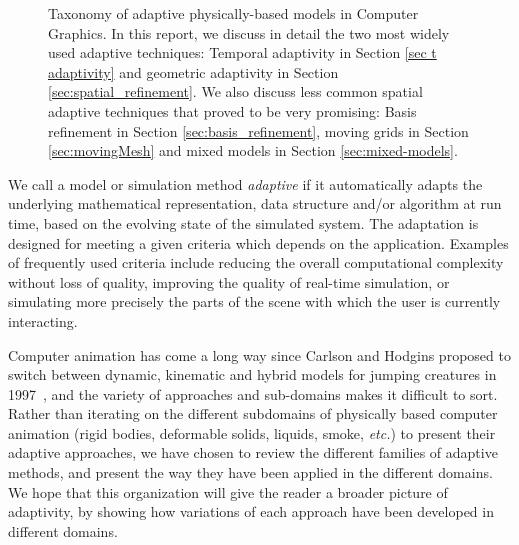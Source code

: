 \begin{figure}
    \caption{\label{fig:taxonomy}Taxonomy of adaptive physically-based models in Computer Graphics. In this report, we discuss in detail the two most widely used adaptive techniques: Temporal adaptivity in Section \ref{sec t adaptivity} and geometric adaptivity in Section \ref{sec:spatial_refinement}. We also discuss less common spatial adaptive techniques that proved to be very promising: Basis refinement in Section \ref{sec:basis_refinement}, moving grids in Section \ref{sec:movingMesh} and mixed models in Section \ref{sec:mixed-models}.}
\end{figure}

We call a model or simulation method \emph{adaptive} if it automatically adapts the underlying mathematical representation, data structure and/or algorithm at run time, based on the evolving state of the simulated system.
The adaptation is designed for meeting a given criteria which depends on the application. Examples of frequently used criteria include reducing the overall computational complexity without loss of quality, improving the quality of real-time simulation, or simulating more precisely the parts of the scene with which the user is currently interacting.

Computer animation has come a long way since Carlson and Hodgins proposed to switch between dynamic, kinematic and hybrid models for jumping creatures in 1997~\cite{Carlson1997}, and the variety of approaches and sub-domains makes it difficult to sort.
Rather than iterating on the different subdomains of physically based computer animation (rigid bodies, deformable solids, liquids, smoke, \textit{etc.}) to present their adaptive approaches, we have chosen to review the different families of adaptive methods, and present the way they have been applied in the different domains.
We hope that this organization will give the reader a broader picture of adaptivity, by showing how variations of each approach have been developed in different domains.

